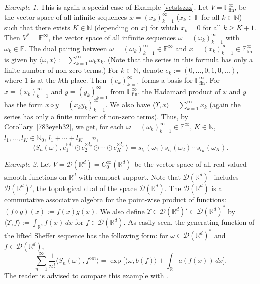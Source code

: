 \documentclass[12pt]{article}
\theoremstyle{remark}
\theoremstyle{remark}
\newtheorem{example}{Example}
\theoremstyle{remark}
\begin{document}
\begin{example}\label{987yt34rtyhj98ufd} This is again a special case of Example \ref{vctstszzz}. Let $V=\mathbb F_{\mathrm{fin}}^\infty$,
 be the vector space of all infinite sequences $x=(x_k)_{k=1}^\infty$ ($x_k\in \mathbb F$  for all $ k\in \mathbb N$) such that there exists $K\in \mathbb N$ (depending on $x$) for which  $x_k=0$   for all $k\geq K+1$. Then $V^*=\mathbb F^\infty$, the vector space of all infinite sequences $\omega=(\omega_k)_{k=1}^\infty$ with $\omega_k\in \mathbb F$. The dual pairing between $\omega=(\omega_k)_{k=1}^\infty\in\mathbb F^\infty$ and $x=(x_k)_{k=1}^\infty\in \mathbb F_{\mathrm{fin}}^\infty$ is given by
$\langle\omega,x\rangle:=\sum_{k=1}^\infty \omega_kx_k$. (Note that the series in this formula 
has only a finite number of non-zero terms.) For $k\in\mathbb N$, denote $e_k:=(0,\dots,0,1,0,\dots)$, where $1$ is at the $k$th place. Then $(e_k)_{k=1}^\infty$ forms a basis for $\mathbb F_{\mathrm{fin}}^\infty$. 
For $x=(x_k)_{k=1}^\infty$ and $y=(y_k)_{k=1}^\infty$ from $\mathbb F_{\mathrm{fin}}^\infty$, 
the Hadamard product of $x$ and $y$ has the form  $x\diamond y=(x_ky_k)_{k=1}^\infty$. We also have $\langle \Upsilon,x\rangle=\sum_{k=1}^\infty x_k$ (again the series has only a finite number of non-zero terms). Thus, by Corollary~\ref{783eyeh32}, we get, for each $\omega=(\omega_k)_{k=1}^\infty\in \mathbb F^\infty$, $K\in\mathbb N$, $l_1,\dots,l_K\in \mathbb N_0,\, l_1+\cdots+l_K=n$,
\begin{equation*}\langle S_n(\omega),e_1^{\odot l_1}\odot e_2^{\odot l_2}\odot\cdots\odot e_K^{\odot l_K}\rangle=s_{l_1}(\omega_1)s_{l_2}(\omega_2)\cdots s_{l_K}(\omega_K).\end{equation*}
\end{example}

\begin{example}\label{cxzfrzrzrs} Let $V=\mathcal D(\mathbb R^d)=C_0^{\infty}(\mathbb R^d)$ be the vector space of all real-valued smooth functions on $\mathbb R^d$ with compact support. Note that $\mathcal D(\mathbb R^d)^*$ includes $\mathcal D(\mathbb R^d)'$, the topological dual of the space $\mathcal D(\mathbb R^d)$. The $\mathcal D(\mathbb R^d)$ is a commutative associative algebra for the point-wise product of functions: $(f\diamond g)(x):=f(x)g(x)$. We also define $\Upsilon\in \mathcal D(\mathbb R^d)'\subset \mathcal D(\mathbb R^d)^*$ by $\langle \Upsilon,f\rangle:=\int_{\mathbb R^d}f(x)\,dx$ for $f\in \mathcal D(\mathbb R^d)$.
As easily seen, the generating function of the lifted Sheffer sequence has the following form: for $\omega\in \mathcal D(\mathbb R^d)^*$ and $f\in \mathcal D(\mathbb R^d)$, 
\begin{equation}\label{dfghjk0987654dcv}
\sum_{n=1}^\infty \frac1{n!}\langle S_n(\omega),f^{\otimes n}\rangle=
\exp\bigg[\langle \omega,b(f)\rangle+\int_{\mathbb R}a(f(x))\,dx\bigg].\end{equation}
The reader is advised to compare this example with \cite[Section~7]{FKLO}.
\end{example}
\end{document}
